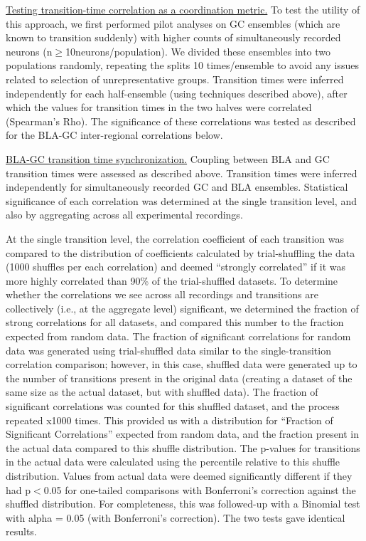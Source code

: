 \begin{refsection}
\noindent\underline{Testing transition-time correlation as a coordination metric.} To test the utility of this approach, we first performed pilot analyses on GC ensembles (which are known to transition suddenly) with higher counts of simultaneously recorded neurons (n$\ge$10neurons/population). We divided these ensembles into two populations randomly, repeating the splits 10 times/ensemble to avoid any issues related to selection of unrepresentative groups. Transition times were inferred independently for each half-ensemble (using techniques described above), after which the values for transition times in the two halves were correlated (Spearman’s Rho). The significance of these correlations was tested as described for the BLA-GC inter-regional correlations below.

\noindent\underline{BLA-GC transition time synchronization.} Coupling between BLA and GC transition times were assessed as described above. Transition times were inferred independently for simultaneously recorded GC and BLA ensembles. Statistical significance of each correlation was determined at the single transition level, and also by aggregating across all experimental recordings. 

At the single transition level, the correlation coefficient of each transition was compared to the distribution of coefficients calculated by trial-shuffling the data (1000 shuffles per each correlation) and deemed “strongly correlated” if it was more highly correlated than 90\% of the trial-shuffled datasets. To determine whether the correlations we see across all recordings and transitions are collectively (i.e., at the aggregate level) significant, we determined the fraction of strong correlations for all datasets, and compared this number to the fraction expected from random data. The fraction of significant correlations for random data was generated using trial-shuffled data similar to the single-transition correlation comparison; however, in this case, shuffled data were generated up to the number of transitions present in the original data (creating a dataset of the same size as the actual dataset, but with shuffled data). The fraction of significant correlations was counted for this shuffled dataset, and the process repeated x1000 times. This provided us with a distribution for “Fraction of Significant Correlations” expected from random data, and the fraction present in the actual data compared to this shuffle distribution. The p-values for transitions in the actual data were calculated using the percentile relative to this shuffle distribution. Values from actual data were deemed significantly different if they had p\(<\)0.05 for one-tailed comparisons with Bonferroni’s correction against the shuffled distribution. For completeness, this was followed-up with a Binomial test with alpha = 0.05 (with Bonferroni’s correction). The two tests gave identical results.


\end{refsection}
